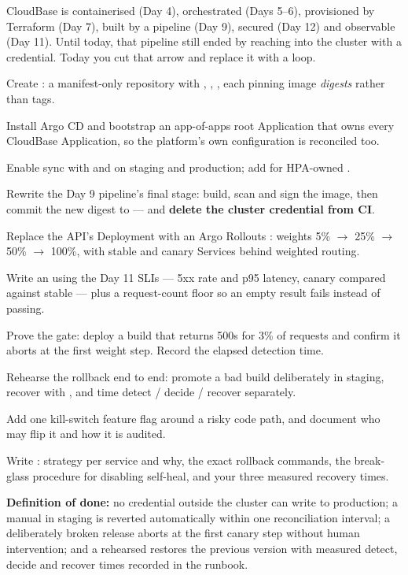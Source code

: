 
CloudBase is containerised (Day 4), orchestrated (Days 5--6), provisioned by Terraform (Day 7), built by a pipeline (Day 9), secured (Day 12) and observable (Day 11). Until today, that pipeline still ended by reaching into the cluster with a credential. Today you cut that arrow and replace it with a loop.

\begin{buildalong}
\begin{wbitem}
  \item Create : a manifest-only repository with , , , each pinning image \emph{digests} rather than tags.
  \item Install Argo CD and bootstrap an app-of-apps root Application that owns every CloudBase Application, so the platform's own configuration is reconciled too.
  \item Enable  sync with  and  on staging and production; add  for HPA-owned .
  \item Rewrite the Day 9 pipeline's final stage: build, scan and sign the image, then commit the new digest to  --- and \textbf{delete the cluster credential from CI}.
  \item Replace the API's Deployment with an Argo Rollouts : weights 5\% $\rightarrow$ 25\% $\rightarrow$ 50\% $\rightarrow$ 100\%, with stable and canary Services behind weighted routing.
  \item Write an  using the Day 11 SLIs --- 5xx rate and p95 latency, canary compared against stable --- plus a request-count floor so an empty result fails instead of passing.
  \item Prove the gate: deploy a build that returns 500s for 3\% of requests and confirm it aborts at the first weight step. Record the elapsed detection time.
  \item Rehearse the rollback end to end: promote a bad build deliberately in staging, recover with , and time detect / decide / recover separately.
  \item Add one kill-switch feature flag around a risky code path, and document who may flip it and how it is audited.
  \item Write : strategy per service and why, the exact rollback commands, the break-glass procedure for disabling self-heal, and your three measured recovery times.
\end{wbitem}
\smallskip\textbf{Definition of done:} no credential outside the cluster can write to production; a manual  in staging is reverted automatically within one reconciliation interval; a deliberately broken release aborts at the first canary step without human intervention; and a rehearsed  restores the previous version with measured detect, decide and recover times recorded in the runbook.
\end{buildalong}

